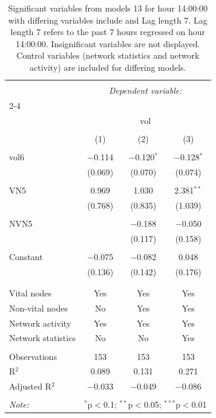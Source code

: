 
\begin{table}[!htbp] \centering 
  \caption{Significant variables from models 13 for hour 14:00:00 with differing variables include 
                               and Lag length 7. Lag length 7 refers to the past 7 hours regressed on hour 14:00:00. 
                               Insignificant variables are not displayed. 
                               Control variables (network statistics and network activity) are 
                               included for differing models.} 
  \label{Volumemodels2_t_hourlagged1} 
\scriptsize 
\begin{tabular}{@{\extracolsep{5pt}}lccc} 
\\[-1.8ex]\hline 
\hline \\[-1.8ex] 
 & \multicolumn{3}{c}{\textit{Dependent variable:}} \\ 
\cline{2-4} 
\\[-1.8ex] & \multicolumn{3}{c}{vol} \\ 
\\[-1.8ex] & (1) & (2) & (3)\\ 
\hline \\[-1.8ex] 
 vol6 & $-$0.114 & $-$0.120$^{*}$ & $-$0.128$^{*}$ \\ 
  & (0.069) & (0.070) & (0.074) \\ 
  & & & \\ 
 VN5 & 0.969 & 1.030 & 2.381$^{**}$ \\ 
  & (0.768) & (0.835) & (1.039) \\ 
  & & & \\ 
 NVN5 &  & $-$0.188 & $-$0.050 \\ 
  &  & (0.117) & (0.158) \\ 
  & & & \\ 
 Constant & $-$0.075 & $-$0.082 & 0.048 \\ 
  & (0.136) & (0.142) & (0.176) \\ 
  & & & \\ 
\hline \\[-1.8ex] 
Vital nodes & Yes & Yes & Yes \\ 
Non-vital nodes & No & Yes & Yes \\ 
Network activity & Yes & Yes & Yes \\ 
Network statistics & No & No & Yes \\ 
\hline &  &  &  \\ 
Observations & 153 & 153 & 153 \\ 
R$^{2}$ & 0.089 & 0.131 & 0.271 \\ 
Adjusted R$^{2}$ & $-$0.033 & $-$0.049 & $-$0.086 \\ 
\hline 
\hline \\[-1.8ex] 
\textit{Note:}  & \multicolumn{3}{r}{$^{*}$p$<$0.1; $^{**}$p$<$0.05; $^{***}$p$<$0.01} \\ 
\end{tabular} 
\end{table} 
